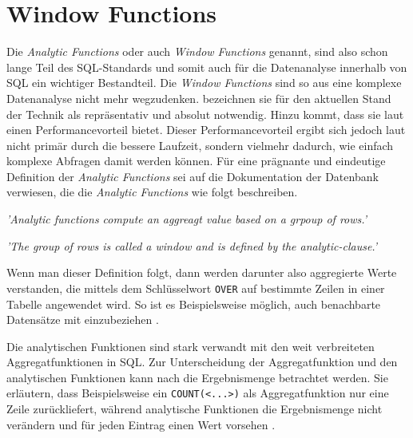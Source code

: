\section{Window Functions}
\label{sec:window_functions} Die \textit{Analytic Functions} oder auch \textit{Window
Functions} genannt, sind also schon lange Teil des SQL-Standards und somit auch
für die Datenanalyse innerhalb von SQL ein wichtiger Bestandteil. Die \textit{Window
Functions} sind so aus eine komplexe Datenanalyse nicht mehr wegzudenken. \citet[Abstract]{cao2012optimization}
bezeichnen sie für den aktuellen Stand der Technik als repräsentativ und absolut
notwendig. Hinzu kommt, dass sie laut \citet[Kapitel 8]{kellenberger2019expert} einen
Performancevorteil bietet. Dieser Performancevorteil ergibt sich jedoch laut
\citet[Kapitel 8]{kellenberger2019expert} nicht primär durch die bessere
Laufzeit, sondern vielmehr dadurch, wie einfach komplexe Abfragen damit werden
können. Für eine prägnante und eindeutige Definition der \textit{Analytic
Functions} sei auf die Dokumentation der \citet{oracle} Datenbank verwiesen, die
die \textit{Analytic Functions} wie folgt beschreiben.
\begin{center}
	\textit{ 'Analytic functions compute an aggreagt value based on a grpoup of
	rows.' } \\ \citep{oracle}

	\textit{ 'The group of rows is called a window and is defined by the analytic-clause.'
	} \\ \citep{oracle}
\end{center}
Wenn man dieser Definition folgt, dann werden darunter also aggregierte Werte verstanden,
die mittels dem Schlüsselwort \texttt{OVER} auf bestimmte Zeilen in einer Tabelle
angewendet wird. So ist es Beispielsweise möglich, auch benachbarte Datensätze mit
einzubeziehen \citep{oracle}.

Die analytischen Funktionen sind stark verwandt mit den weit verbreiteten
Aggregatfunktionen in SQL. Zur Unterscheidung der Aggregatfunktion und den analytischen
Funktionen kann nach \citet{Nuijten2023} die Ergebnismenge betrachtet werden. Sie
erläutern, dass Beispielsweise ein \texttt{COUNT(<...>)} als Aggregatfunktion nur
eine Zeile zurückliefert, während analytische Funktionen die Ergebnismenge nicht
verändern und für jeden Eintrag einen Wert vorsehen \citep{Nuijten2023}.

